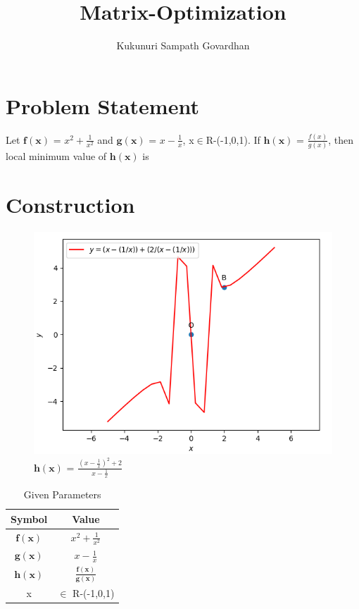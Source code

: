 \documentclass[journal,12pt,twocolumn]{IEEEtran}
\title{
Matrix-Optimization
}
\author{Kukunuri Sampath Govardhan}
\let\vec\mathbf
\begin{document}
\maketitle
\tableofcontents
\bigskip
\section{Problem Statement}
\begin{flushleft}
Let $\vec{f(x)}$ = $x^2+\frac{1}{x^2}$ and $\vec{g(x)}$ = $x-\frac{1}{x}$, x$\in$R-(-1,0,1). If $\vec{h(x)}$ = $\frac{f(x)}{g(x)}$, then local minimum value of $\vec{h(x)}$ is \\
\end{flushleft}
\section{Construction}
\begin{figure}[h]
	\centering
	\includegraphics[width=\columnwidth]{figs/fig7.png}
	\caption{$\vec{h(x)}$ = $\frac{(x-\frac{1}{x})^2 + 2}{x-\frac{1}{x}}$}
	\label{fig:my_label}
\end{figure}
\begin{table}[h]
    \centering
    \begin{tabular}{|c|c|}
       \hline
       \textbf{Symbol}&\textbf{Value}  \\
       \hline
	    $\vec{f(x)}$ & $x^2+\frac{1}{x^2}$ \\
        \hline
	    $\vec{g(x)}$ & $x-\frac{1}{x}$\\
        \hline
	    $\vec{h(x)}$ & $\frac{\vec{f(x)}}{\vec{g(x)}}$ \\
        \hline
        x & $\in$ R-(-1,0,1)\\
        \hline
    \end{tabular}
    \caption{Given Parameters}
    \label{tab:my_label}
\end{table}
\vspace{0.3cm}
\end{document}
